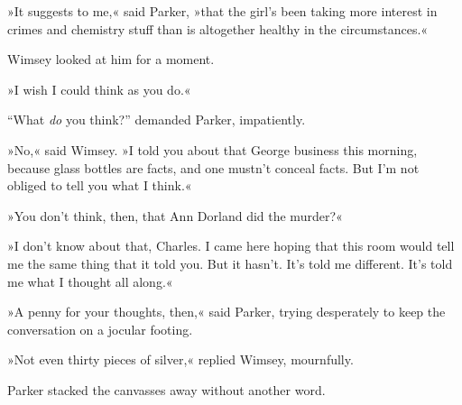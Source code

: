 »It suggests to me,« said Parker, »that the girl's been taking more interest in crimes and chemistry stuff than is altogether healthy in the circumstances.«

Wimsey looked at him for a moment.

»I wish I could think as you do.«

\enquote{What \textit{do} you think?} demanded Parker, impatiently.

»No,« said Wimsey. »I told you about that George business this morning, because glass bottles are facts, and one mustn't conceal facts. But I'm not obliged to tell you what I think.«

»You don't think, then, that Ann Dorland did the murder?«

»I don't know about that, Charles. I came here hoping that this room would tell me the same thing that it told you. But it hasn't. It's told me different. It's told me what I thought all along.«

»A penny for your thoughts, then,« said Parker, trying desperately to keep the conversation on a jocular footing.

»Not even thirty pieces of silver,« replied Wimsey, mournfully.

Parker stacked the canvasses away without another word.